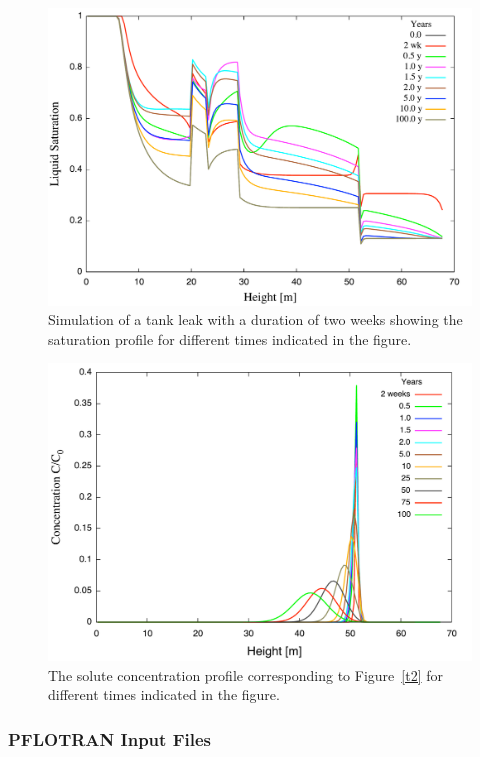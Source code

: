 \documentclass[12pt]{article}
\begin{document}
\begin{figure}[h]\centering
\includegraphics[scale=0.45]{./figs/sat_leak}
\caption{Simulation of a tank leak with a duration of two weeks showing the saturation profile for different times indicated in the figure.}\label{f2}
\end{figure}

\begin{figure}[h]\centering
\includegraphics[scale=0.45]{./figs/conc}
\caption{The solute concentration profile corresponding to Figure~\ref{t2} for different times indicated in the figure.}\label{f3}
\end{figure}

\clearpage

\subsubsection{PFLOTRAN Input Files}
\end{document}
